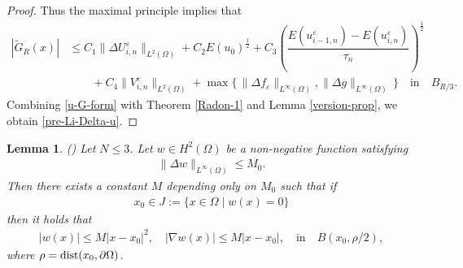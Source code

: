 \documentclass[12pt]{amsart}
\newtheorem{lem}{Lemma}[section]
\begin{document}
\begin{proof}
Thus the maximal principle implies that 
\begin{align*}
| \tilde{G}_{R}(x) |  
& \le C_1 \| \Delta U^{\varepsilon}_{i,n} \|_{L^2(\Omega)} 
+ C_2 E(u_0)^{\frac{1}{2}} + C_3 \left( \dfrac{E(u^{\varepsilon}_{i-1,n}) - E(u^{\varepsilon}_{i,n})}{\tau_n} \right)^{\frac{1}{2}}  \\
& \qquad + C_4 \| V^{\varepsilon}_{i,n} \|_{L^2(\Omega)} 
        + \max\{\, \| \Delta f_{\varepsilon} \|_{L^\infty(\Omega)}, \| \Delta g \|_{L^\infty(\Omega)} \,\}
 \quad \text{in} \quad B_{R/3}.  
\end{align*}
Combining \eqref{u-G-form} with Theorem \ref{Radon-1} and Lemma \ref{version-prop}, we obtain \eqref{pre-Li-Delta-u}.  
\end{proof}

\begin{lem}{{\rm (\cite{CFT})}} \label{CFT-lem}
Let $N \le 3$. Let $w \in H^2(\Omega)$ be a non-negative function satisfying 
\begin{align*}
\| \Delta w \|_{L^\infty(\Omega)} \le M_0. 
\end{align*}
Then there exists a constant $M$ depending only on $M_0$ such that if 
\begin{align*}
x_0 \in J := \{ x \in \Omega \mid w(x)=0 \}
\end{align*}
then it holds that 
\begin{align}
| w(x) | \le M | x-x_0 |^2, \quad | \nabla w(x) | \le M | x - x_0 |, \quad \text{in} \quad B(x_0, \rho/2), 
\end{align}
where $\rho= {\rm dist}(x_0, {\partial} \Omega)$. 
\end{lem}
\end{document}
